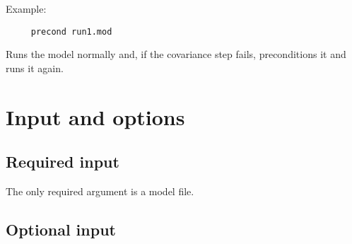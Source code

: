 Example:

\begin{verbatim}
     precond run1.mod
\end{verbatim}
Runs the model normally and, if the covariance step fails, preconditions it and runs it again.

\section{Input and options}

\subsection{Required input}
The only required argument is a model file.

\subsection{Optional input}

